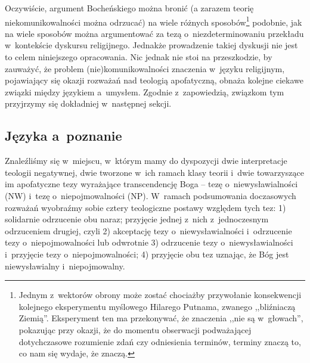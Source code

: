 Oczywiście, argument Bocheńskiego można bronić (a zarazem teorię niekomunikowalności można odrzucać) na wiele różnych sposobów\footnote{Jednym z~wektorów obrony może zostać chociażby przywołanie konsekwencji kolejnego eksperymentu myślowego Hilarego Putnama, zwanego ,,bliźniaczą Ziemią''. Eksperyment ten ma przekonywać, że znaczenia ,,nie są w~głowach'', pokazując przy okazji, że do momentu obserwacji podważającej dotychczasowe rozumienie zdań czy odniesienia terminów, terminy znaczą to, co nam się wydaje, że znaczą.%
} podobnie, jak na wiele sposobów można argumentować za tezą o~niezdeterminowaniu przekładu w~kontekście dyskursu religijnego. Jednakże prowadzenie takiej dyskusji nie jest to celem niniejszego opracowania. Nic jednak nie stoi na przeszkodzie, by zauważyć, że problem (nie)komunikowalności znaczenia w~języku religijnym, pojawiający się okazji rozważań nad teologią apofatyczną, obnaża kolejne ciekawe związki między językiem a~umysłem. Zgodnie z~zapowiedzią, związkom tym przyjrzymy się dokładniej w~następnej sekcji.

\subsection{Języka a~poznanie}

Znaleźliśmy się w~miejscu, w~którym mamy do dyspozycji dwie interpretacje teologii negatywnej, dwie tworzone w~ich ramach klasy teorii i~dwie towarzyszące im apofatyczne tezy wyrażające transcendencję Boga -- tezę o~niewysławialności (NW) i~tezę o~niepojmowalności (NP). W~ramach podsumowania doczasowych rozważań wyobraźmy sobie cztery teologiczne postawy względem tych tez: 1) solidarnie odrzucenie obu naraz; przyjęcie jednej z~nich z~jednoczesnym odrzuceniem drugiej, czyli 2) akceptację tezy o~niewysławialności i~odrzucenie tezy o~niepojmowalności lub odwrotnie 3) odrzucenie tezy o~niewysławialności i~przyjęcie tezy o~niepojmowalności; 4) przyjęcie obu tez uznając, że Bóg jest niewysławialny i~niepojmowalny.

